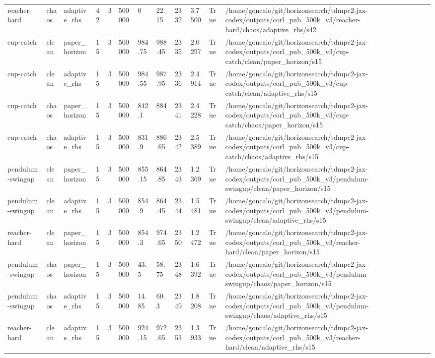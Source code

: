 \begin{tabular}{llllllllllll}
reacher-hard & chaos & adaptive\_rhs & 42 & 3 & 500000 & 0 & 22.15 & 2332 & 3.7500 & True & /home/goncalo/git/horizonsearch/tdmpc2-jax-codex/outputs/corl\_pub\_500k\_v3/reacher-hard/chaos/adaptive\_rhs/s42 \\
cup-catch & clean & paper\_horizon & 15 & 3 & 500000 & 984.75 & 988.45 & 2335 & 2.0297 & True & /home/goncalo/git/horizonsearch/tdmpc2-jax-codex/outputs/corl\_pub\_500k\_v3/cup-catch/clean/paper\_horizon/s15 \\
cup-catch & clean & adaptive\_rhs & 15 & 3 & 500000 & 984.55 & 987.95 & 2336 & 2.4914 & True & /home/goncalo/git/horizonsearch/tdmpc2-jax-codex/outputs/corl\_pub\_500k\_v3/cup-catch/clean/adaptive\_rhs/s15 \\
cup-catch & chaos & paper\_horizon & 15 & 3 & 500000 & 842.1 & 884 & 2341 & 2.4228 & True & /home/goncalo/git/horizonsearch/tdmpc2-jax-codex/outputs/corl\_pub\_500k\_v3/cup-catch/chaos/paper\_horizon/s15 \\
cup-catch & chaos & adaptive\_rhs & 15 & 3 & 500000 & 831.9 & 886.65 & 2342 & 2.5389 & True & /home/goncalo/git/horizonsearch/tdmpc2-jax-codex/outputs/corl\_pub\_500k\_v3/cup-catch/chaos/adaptive\_rhs/s15 \\
pendulum-swingup & clean & paper\_horizon & 15 & 3 & 500000 & 855.15 & 864.85 & 2343 & 1.2369 & True & /home/goncalo/git/horizonsearch/tdmpc2-jax-codex/outputs/corl\_pub\_500k\_v3/pendulum-swingup/clean/paper\_horizon/s15 \\
pendulum-swingup & clean & adaptive\_rhs & 15 & 3 & 500000 & 854.9 & 864.45 & 2344 & 1.5481 & True & /home/goncalo/git/horizonsearch/tdmpc2-jax-codex/outputs/corl\_pub\_500k\_v3/pendulum-swingup/clean/adaptive\_rhs/s15 \\
reacher-hard & clean & paper\_horizon & 15 & 3 & 500000 & 854.3 & 974.65 & 2350 & 1.2472 & True & /home/goncalo/git/horizonsearch/tdmpc2-jax-codex/outputs/corl\_pub\_500k\_v3/reacher-hard/clean/paper\_horizon/s15 \\
pendulum-swingup & chaos & paper\_horizon & 15 & 3 & 500000 & 43.5 & 58.75 & 2348 & 1.6392 & True & /home/goncalo/git/horizonsearch/tdmpc2-jax-codex/outputs/corl\_pub\_500k\_v3/pendulum-swingup/chaos/paper\_horizon/s15 \\
pendulum-swingup & chaos & adaptive\_rhs & 15 & 3 & 500000 & 14.85 & 60.3 & 2349 & 1.8208 & True & /home/goncalo/git/horizonsearch/tdmpc2-jax-codex/outputs/corl\_pub\_500k\_v3/pendulum-swingup/chaos/adaptive\_rhs/s15 \\
reacher-hard & clean & adaptive\_rhs & 15 & 3 & 500000 & 924.15 & 972.65 & 2353 & 1.3933 & True & /home/goncalo/git/horizonsearch/tdmpc2-jax-codex/outputs/corl\_pub\_500k\_v3/reacher-hard/clean/adaptive\_rhs/s15 \\

\end{tabular}
